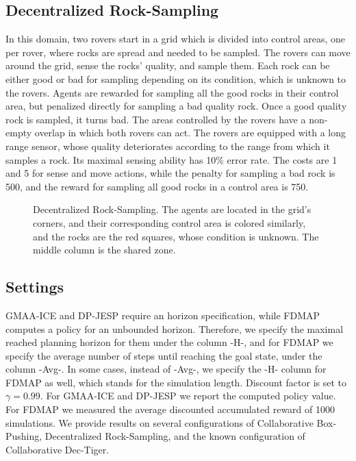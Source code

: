 \documentclass[letterpaper]{article}
\theoremstyle{definition}
\newcommand{\cbp}[0]{Collaborative Box-Pushing}
\newcommand{\cdt}[0]{Collaborative Dec-Tiger}
\newcommand{\drs}[0]{Decentralized Rock-Sampling}
\begin{document}
\subsection{\drs}
In this domain, two rovers start in a grid which is divided into control areas, one per rover, where rocks are spread and needed to be sampled. The rovers can move around the grid, sense the rocks' quality, and sample them. Each rock can be either good or bad for sampling depending on its condition, which is unknown to the rovers. Agents are rewarded for sampling all the good rocks in their control area, but penalized directly for sampling a bad quality rock. Once a good quality rock is sampled, it turns bad. The areas controlled by the rovers
have a non-empty overlap in which both rovers can act.
The rovers are equipped with a long range sensor, whose quality deteriorates according to the range from which it samples a rock. Its maximal sensing ability has 10\% error rate.
The costs are 1 and 5 for sense and move actions, while the penalty for sampling a bad rock is 500, and the reward for sampling all good rocks in a control area is 750.


\begin{figure}
    \centering
\caption{\label{Fig:DRS} \drs. The agents are located in the grid's corners, and their corresponding control area is colored similarly, and the rocks are the red squares, whose condition is unknown. The middle column is the shared zone.}
\end{figure}



\subsection{Settings} 

GMAA-ICE and DP-JESP require an horizon specification, while FDMAP computes a policy for an unbounded horizon. Therefore, we specify the maximal reached planning horizon for them under the column -H-, and for FDMAP we specify the average number of steps until reaching the goal state, under the column -Avg-. In some cases, instead of -Avg-, we specify the -H- column for FDMAP as well, which stands for the simulation length. Discount factor is set to $\gamma=0.99$.
%
For GMAA-ICE and DP-JESP we report the computed policy value. For FDMAP we measured the average discounted accumulated reward of 1000 simulations.
%
We provide results on several configurations of \cbp, \drs , and the known configuration of \cdt.
\end{document}
